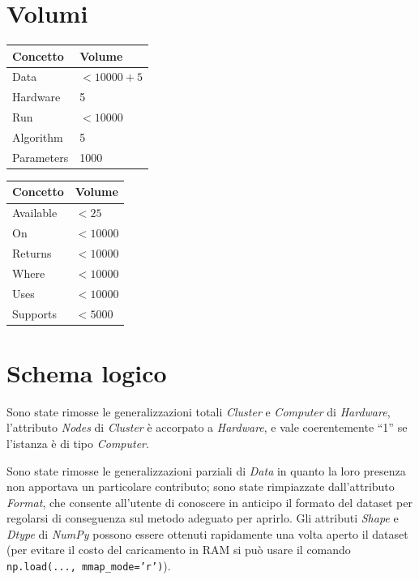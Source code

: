 \documentclass{article}
\begin{document}
\section{Volumi}
\begin{table}[H]
    \begin{minipage}{.5\linewidth}
      \vspace{-1cm}
      \centering
      \begin{tabular}{||l l||}
        \hline
        Concetto & Volume \\ [0.5ex]
        \hline\hline
        Data & $<10000 + 5$\\
        Hardware & 5\\
        Run & $<10000$\\
        Algorithm & 5\\
        Parameters & 1000\\
        \hline
       \end{tabular}
    \end{minipage}
    \begin{minipage}{.5\linewidth}
      \vspace{-0.55cm}
      \centering
        \begin{tabular}{||l l||}
            \hline
            Concetto & Volume \\ [0.5ex]
            \hline\hline
            Available & $<25$\\
            On & $<10000$\\
            Returns & $<10000$\\
            Where & $<10000$\\
            Uses & $<10000$\\
            Supports & $<5000$\\
            \hline
           \end{tabular}
    \end{minipage}
\end{table}

\section{Schema logico}
Sono state rimosse le generalizzazioni totali \emph{Cluster} e \emph{Computer} di \emph{Hardware}, l'attributo \emph{Nodes} di \emph{Cluster} è accorpato a \emph{Hardware}, e vale coerentemente ``1'' se l'istanza è di tipo \emph{Computer}.

Sono state rimosse le generalizzazioni parziali di \emph{Data} in quanto la loro presenza non apportava un particolare contributo; sono state rimpiazzate dall'attributo \emph{Format}, che consente all'utente di conoscere in anticipo il formato del dataset per regolarsi di conseguenza sul metodo adeguato per aprirlo. Gli attributi \emph{Shape} e \emph{Dtype} di \emph{NumPy} possono essere ottenuti rapidamente una volta aperto il dataset (per evitare il costo del caricamento in RAM si può usare il comando \texttt{np.load(..., mmap\_mode='r')}).
\end{document}
